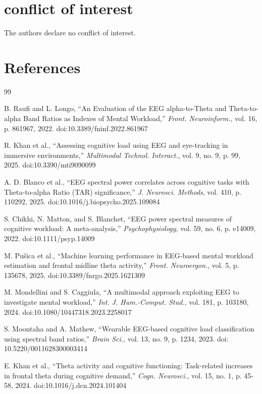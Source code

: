 \documentclass[10pt]{iopart}
\begin{document}
\section*{conflict of interest}
The authors declare no conflict of interest.

\section*{References}

\begin{thebibliography}{99}
\footnotesize


B. Raufi and L. Longo, ``An Evaluation of the EEG alpha-to-Theta and Theta-to-alpha Band Ratios as Indexes of Mental Workload,'' \emph{Front. Neuroinform.}, vol. 16, p. 861967, 2022. doi:10.3389/fninf.2022.861967

R. Khan et al., ``Assessing cognitive load using EEG and eye-tracking in immersive environments,'' \emph{Multimodal Technol. Interact.}, vol. 9, no. 9, p. 99, 2025. doi:10.3390/mti9090099

A. D. Blanco et al., ``EEG spectral power correlates across cognitive tasks with Theta-to-alpha Ratio (TAR) significance,'' \emph{J. Neurosci. Methods}, vol. 410, p. 110292, 2025. doi:10.1016/j.biopsycho.2025.109084

S. Chikhi, N. Matton, and S. Blanchet, ``EEG power spectral measures of cognitive workload: A meta-analysis,'' \emph{Psychophysiology}, vol. 59, no. 6, p. e14009, 2022. doi:10.1111/psyp.14009

M. Pušica et al., ``Machine learning performance in EEG-based mental workload estimation and frontal midline theta activity,'' \emph{Front. Neuroergon.}, vol. 5, p. 135678, 2025. doi:10.3389/fnrgo.2025.1621309

M. Mondellini and S. Caggiula, ``A multimodal approach exploiting EEG to investigate mental workload,'' \emph{Int. J. Hum.-Comput. Stud.}, vol. 181, p. 103180, 2024. doi:10.1080/10447318.2023.2258017

S. Moontaha and A. Mathew, ``Wearable EEG-based cognitive load classification using spectral band ratios,'' \emph{Brain Sci.}, vol. 13, no. 9, p. 1234, 2023. doi: 10.5220/0011628300003414

E. Khan et al., ``Theta activity and cognitive functioning: Task-related increases in frontal theta during cognitive demand,'' \emph{Cogn. Neurosci.}, vol. 15, no. 1, p. 45-58, 2024. doi:10.1016/j.dcn.2024.101404


\end{thebibliography}
\end{document}
